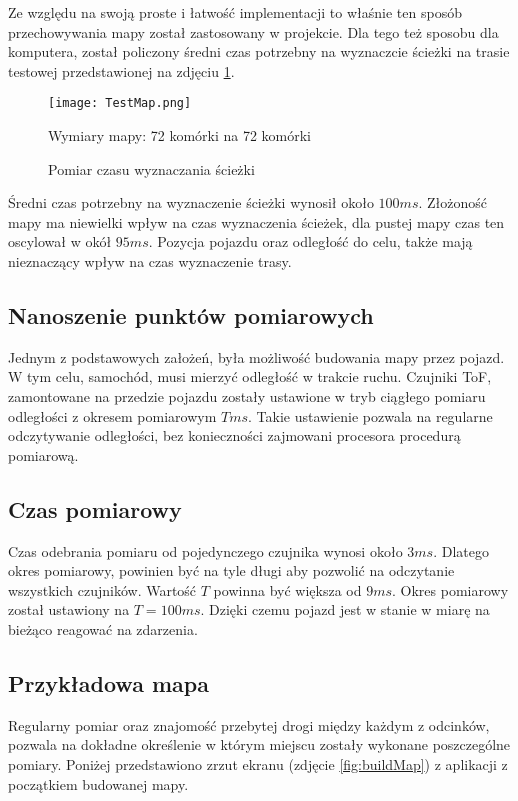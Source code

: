             Ze względu na swoją proste i łatwość implementacji to właśnie ten sposób przechowywania mapy został zastosowany w projekcie.
            Dla tego też sposobu dla komputera, został policzony średni czas potrzebny na wyznaczcie ścieżki na trasie testowej przedstawionej na zdjęciu \ref{fig:pathFindingTime}.
            \begin{figure}
                \centering
                \texttt{[image: TestMap.png]}
                \caption{Pomiar czasu wyznaczania ścieżki}
                Wymiary mapy: 72 komórki na 72 komórki
                \label{fig:pathFindingTime}
            \end{figure}

            Średni czas potrzebny na wyznaczenie ścieżki wynosił około $100ms$.
            Złożoność mapy ma niewielki wpływ na czas wyznaczenia ścieżek, dla pustej mapy czas ten oscylował w okół $95ms$.
            Pozycja pojazdu oraz odległość do celu, także mają nieznaczący wpływ na czas wyznaczenie trasy.
            
    \subsection{Nanoszenie punktów pomiarowych}
        Jednym z podstawowych założeń, była możliwość budowania mapy przez pojazd.
        W tym celu, samochód, musi mierzyć odległość w trakcie ruchu.
        Czujniki ToF, zamontowane na przedzie pojazdu zostały ustawione w tryb ciągłego pomiaru odległości z okresem pomiarowym $T ms$.
        Takie ustawienie pozwala na regularne odczytywanie odległości, bez konieczności zajmowani procesora procedurą pomiarową.

        \subsection{Czas pomiarowy}
            Czas odebrania pomiaru od pojedynczego czujnika wynosi około $3ms$.
            Dlatego okres pomiarowy, powinien być na tyle długi aby pozwolić na odczytanie wszystkich czujników.
            Wartość $T$ powinna być większa od $9ms$.
            Okres pomiarowy został ustawiony na $T = 100ms$. 
            Dzięki czemu pojazd jest w stanie w miarę na bieżąco reagować na zdarzenia.

        \subsection{Przykładowa mapa}
            Regularny pomiar oraz znajomość przebytej drogi między każdym z odcinków, pozwala na dokładne określenie w którym miejscu zostały wykonane poszczególne pomiary.
            Poniżej przedstawiono zrzut ekranu (zdjęcie \ref{fig:buildMap}) z aplikacji z początkiem budowanej mapy.

